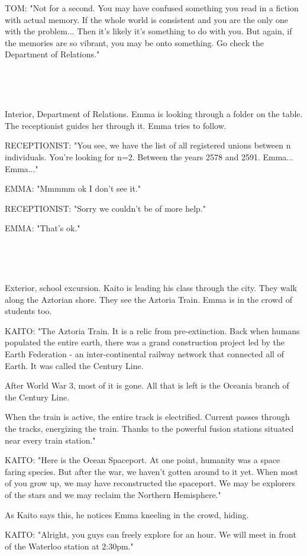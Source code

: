 \documentclass[11pt]{article}
\begin{document}
TOM: "Not for a second. You may have confused something you read in a fiction with actual memory.
If the whole world is consistent and you are the only one with the problem...
Then it's likely it's something to do with you.
But again, if the memories are so vibrant, you may be onto something.
Go check the Department of Relations."

\ 

\ 

Interior, Department of Relations.
Emma is looking through a folder on the table.
The receptionist guides her through it.
Emma tries to follow.

RECEPTIONIST: "You see, we have the list of all registered unions between n individuals. 
You're looking for n=2.
Between the years 2578 and 2591.
Emma...
Emma..."

EMMA: "Mmmmm ok I don't see it."

RECEPTIONIST: "Sorry we couldn't be of more help."

EMMA: "That's ok."

\ 

\ 

Exterior, school excursion.
Kaito is leading his class through the city.
They walk along the Aztorian shore. 
They see the Aztoria Train.
Emma is in the crowd of students too.

KAITO: "The Aztoria Train. 
It is a relic from pre-extinction.
Back when humans populated the entire earth, there was a grand construction project led by the Earth Federation - an inter-continental railway network that connected all of Earth.
It was called the Century Line.

After World War 3, most of it is gone.
All that is left is the Oceania branch of the Century Line.

When the train is active, the entire track is electrified.
Current passes through the tracks, energizing the train.
Thanks to the powerful fusion stations situated near every train station."

KAITO: "Here is the Ocean Spaceport.
At one point, humanity was a space faring species. 
But after the war, we haven't gotten around to it yet.
When most of you grow up, we may have reconstructed the spaceport. 
We may be explorers of the stars and we may reclaim the Northern Hemisphere."

As Kaito says this, he notices Emma kneeling in the crowd, hiding.

KAITO: "Alright, you guys can freely explore for an hour.
We will meet in front of the Waterloo station at 2:30pm."
\end{document}
